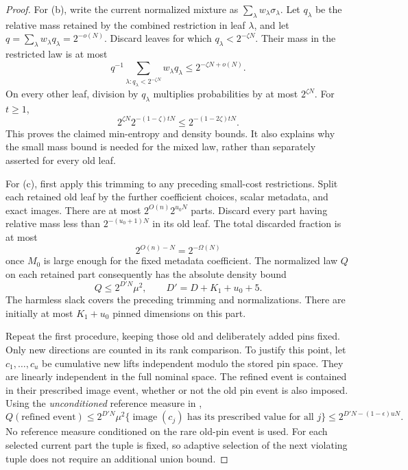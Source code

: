 \begin{proof}
For (b), write the current normalized mixture as
\(\sum_\lambda w_\lambda\sigma_\lambda\).
Let \(q_\lambda\) be the relative mass retained by the combined restriction in leaf \(\lambda\), and let
\(q=\sum_\lambda w_\lambda q_\lambda=2^{-o(N)}\).
Discard leaves for which \(q_\lambda<2^{-\zeta N}\).
Their mass in the restricted law is at most
\[
 q^{-1}\sum_{\lambda:q_\lambda<2^{-\zeta N}}
       w_\lambda q_\lambda
 \le 2^{-\zeta N+o(N)}.
\]
On every other leaf, division by \(q_\lambda\) multiplies probabilities by at most \(2^{\zeta N}\).
For \(t\ge1\),
\[
 2^{\zeta N}2^{-(1-\zeta)tN}
 \le2^{-(1-2\zeta)tN}.
\]
This proves the claimed min-entropy and density bounds.
It also explains why the small mass bound is needed for the mixed law, rather than separately asserted for every old leaf.

For (c), first apply this trimming to any preceding small-cost restrictions.
Split each retained old leaf by the further coefficient choices, scalar metadata, and exact images.
There are at most \(2^{O(n)}2^{u_0N}\) parts.
Discard every part having relative mass less than
\(2^{-(u_0+1)N}\) in its old leaf.
The total discarded fraction is at most
\[
 2^{O(n)-N}=2^{-\Omega(N)}
\]
once \(M_0\) is large enough for the fixed metadata coefficient.
The normalized law \(Q\) on each retained part consequently has the absolute density bound
\begin{equation}\label{eq:second-peeling-start}
 Q\le2^{D'N}\mu^2,\qquad D'=D+K_1+u_0+5.
\end{equation}
The harmless slack covers the preceding trimming and normalizations.
There are initially at most \(K_1+u_0\) pinned dimensions on this part.

Repeat the first procedure, keeping those old and deliberately added pins fixed.
Only new directions are counted in its rank comparison.
To justify this point, let \(c_1,\ldots,c_u\) be cumulative new lifts independent modulo the stored pin space.
They are linearly independent in the full nominal space.
The refined event is contained in their prescribed image event, whether or not the old pin event is also imposed.
Using the \emph{unconditioned} reference measure in ,
\[
 Q(\text{refined event})
 \le 2^{D'N}
     \mu^2\{\operatorname{image}(c_j)\text{ has its prescribed value for all }j\}
 \le2^{D'N-(1-\epsilon)uN}.
\]
No reference measure conditioned on the rare old-pin event is used.
For each selected current part the tuple is fixed, so adaptive selection of the next violating tuple does not require an additional union bound.


\end{proof}
